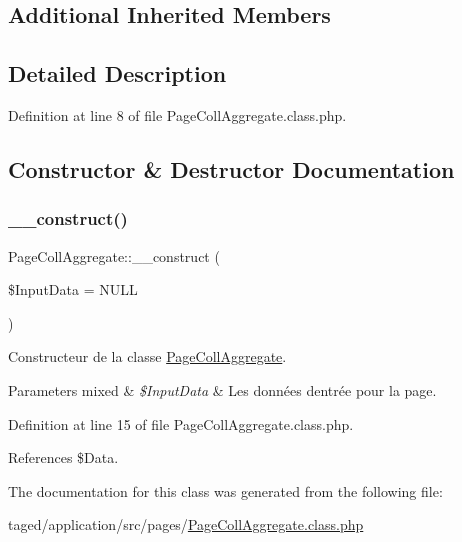 \subsection*{Additional Inherited Members}


\subsection{Detailed Description}


Definition at line 8 of file Page\+Coll\+Aggregate.\+class.\+php.



\subsection{Constructor \& Destructor Documentation}
\mbox{\label{class_page_coll_aggregate_aa2925bde9ed69a2a68509baf00b7989c}} 
\subsubsection{\texorpdfstring{\+\_\+\+\_\+construct()}{\_\_construct()}}
{\footnotesize\ttfamily Page\+Coll\+Aggregate\+::\+\_\+\+\_\+construct (\begin{DoxyParamCaption}\item[{}]{\$\+Input\+Data = {\ttfamily NULL} }\end{DoxyParamCaption})}

Constructeur de la classe \hyperlink{class_page_coll_aggregate}{Page\+Coll\+Aggregate}.


\begin{DoxyParams}[1]{Parameters}
mixed & {\em \$\+Input\+Data} & Les données d\textquotesingle{}entrée pour la page. \\
\hline
\end{DoxyParams}


Definition at line 15 of file Page\+Coll\+Aggregate.\+class.\+php.



References \$\+Data.



The documentation for this class was generated from the following file\+:\begin{DoxyCompactItemize}
\item 
taged/application/src/pages/\hyperlink{_page_coll_aggregate_8class_8php}{Page\+Coll\+Aggregate.\+class.\+php}\end{DoxyCompactItemize}
